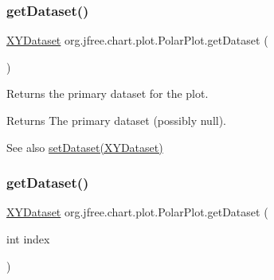 \mbox{\label{classorg_1_1jfree_1_1chart_1_1plot_1_1_polar_plot_a892ef9a10b53bb72c6f6ccc003236f9a}} 
\subsubsection{\texorpdfstring{get\+Dataset()}{getDataset()}\hspace{0.1cm}{\footnotesize\ttfamily [1/2]}}
{\footnotesize\ttfamily \mbox{\hyperlink{interfaceorg_1_1jfree_1_1data_1_1xy_1_1_x_y_dataset}{X\+Y\+Dataset}} org.\+jfree.\+chart.\+plot.\+Polar\+Plot.\+get\+Dataset (\begin{DoxyParamCaption}{ }\end{DoxyParamCaption})}

Returns the primary dataset for the plot.

\begin{DoxyReturn}{Returns}
The primary dataset (possibly {\ttfamily null}).
\end{DoxyReturn}
\begin{DoxySeeAlso}{See also}
\mbox{\hyperlink{classorg_1_1jfree_1_1chart_1_1plot_1_1_polar_plot_a6efa675b137d949333947bb975095865}{set\+Dataset(\+X\+Y\+Dataset)}} 
\end{DoxySeeAlso}
\mbox{\label{classorg_1_1jfree_1_1chart_1_1plot_1_1_polar_plot_af389ea8f23f5fa9343c96faa7f8fddbb}} 
\subsubsection{\texorpdfstring{get\+Dataset()}{getDataset()}\hspace{0.1cm}{\footnotesize\ttfamily [2/2]}}
{\footnotesize\ttfamily \mbox{\hyperlink{interfaceorg_1_1jfree_1_1data_1_1xy_1_1_x_y_dataset}{X\+Y\+Dataset}} org.\+jfree.\+chart.\+plot.\+Polar\+Plot.\+get\+Dataset (\begin{DoxyParamCaption}\item[{int}]{index }\end{DoxyParamCaption})}

